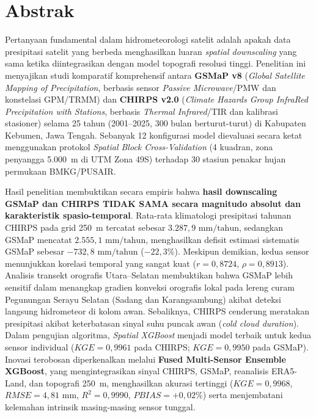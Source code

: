 \documentclass[11pt,a4paper,titlepage]{article}
\begin{document}
\section*{Abstrak}
\noindent
Pertanyaan fundamental dalam hidrometeorologi satelit adalah apakah data presipitasi satelit yang berbeda menghasilkan luaran \textit{spatial downscaling} yang sama ketika diintegrasikan dengan model topografi resolusi tinggi. Penelitian ini menyajikan studi komparatif komprehensif antara \textbf{GSMaP v8} (\textit{Global Satellite Mapping of Precipitation}, berbasis sensor \textit{Passive Microwave}/PMW dan konstelasi GPM/TRMM) dan \textbf{CHIRPS v2.0} (\textit{Climate Hazards Group InfraRed Precipitation with Stations}, berbasis \textit{Thermal Infrared}/TIR dan kalibrasi stasioner) selama 25 tahun (2001--2025, 300 bulan berturut-turut) di Kabupaten Kebumen, Jawa Tengah. Sebanyak 12 konfigurasi model dievaluasi secara ketat menggunakan protokol \textit{Spatial Block Cross-Validation} (4 kuadran, zona penyangga 5.000~m di UTM Zona 49S) terhadap 30 stasiun penakar hujan permukaan BMKG/PUSAIR. 

Hasil penelitian membuktikan secara empiris bahwa \textbf{hasil downscaling GSMaP dan CHIRPS TIDAK SAMA secara magnitudo absolut dan karakteristik spasio-temporal}. Rata-rata klimatologi presipitasi tahunan CHIRPS pada grid 250~m tercatat sebesar $3.287,9\text{ mm/tahun}$, sedangkan GSMaP mencatat $2.555,1\text{ mm/tahun}$, menghasilkan defisit estimasi sistematis GSMaP sebesar $-732,8\text{ mm/tahun}$ ($-22,3\%$). Meskipun demikian, kedua sensor menunjukkan korelasi temporal yang sangat kuat ($r = 0,8724$, $\rho = 0,8913$). Analisis transekt orografis Utara--Selatan membuktikan bahwa GSMaP lebih sensitif dalam menangkap gradien konveksi orografis lokal pada lereng curam Pegunungan Serayu Selatan (Sadang dan Karangsambung) akibat deteksi langsung hidrometeor di kolom awan. Sebaliknya, CHIRPS cenderung meratakan presipitasi akibat keterbatasan sinyal suhu puncak awan (\textit{cold cloud duration}). Dalam pengujian algoritma, \textit{Spatial XGBoost} menjadi model terbaik untuk kedua sensor individual ($KGE = 0,9961$ pada CHIRPS; $KGE = 0,9950$ pada GSMaP). Inovasi terobosan diperkenalkan melalui \textbf{Fused Multi-Sensor Ensemble XGBoost}, yang mengintegrasikan sinyal CHIRPS, GSMaP, reanalisis ERA5-Land, dan topografi 250~m, menghasilkan akurasi tertinggi ($KGE = 0,9968$, $RMSE = 4,81\text{ mm}$, $R^2 = 0,9990$, $PBIAS = +0,02\%$) serta menjembatani kelemahan intrinsik masing-masing sensor tunggal.
\end{document}

